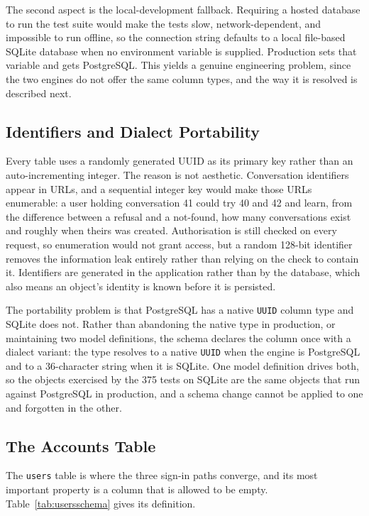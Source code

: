 The second aspect is the local-development fallback. Requiring a hosted database to run the
test suite would make the tests slow, network-dependent, and impossible to run offline, so
the connection string defaults to a local file-based SQLite database when no environment
variable is supplied. Production sets that variable and gets PostgreSQL. This yields a
genuine engineering problem, since the two engines do not offer the same column types, and
the way it is resolved is described next.

\subsection{Identifiers and Dialect Portability}

Every table uses a randomly generated UUID as its primary key rather than an
auto-incrementing integer. The reason is not aesthetic. Conversation identifiers appear in
URLs, and a sequential integer key would make those URLs enumerable: a user holding
conversation 41 could try 40 and 42 and learn, from the difference between a refusal and a
not-found, how many conversations exist and roughly when theirs was created. Authorisation
is still checked on every request, so enumeration would not grant access, but a random
128-bit identifier removes the information leak entirely rather than relying on the check to
contain it. Identifiers are generated in the application rather than by the database, which
also means an object's identity is known before it is persisted.

The portability problem is that PostgreSQL has a native \texttt{UUID} column type and SQLite
does not. Rather than abandoning the native type in production, or maintaining two model
definitions, the schema declares the column once with a dialect variant: the type resolves to
a native \texttt{UUID} when the engine is PostgreSQL and to a 36-character string when it is
SQLite. One model definition drives both, so the objects exercised by the 375 tests on SQLite
are the same objects that run against PostgreSQL in production, and a schema change cannot
be applied to one and forgotten in the other.

\subsection{The Accounts Table}

The \texttt{users} table is where the three sign-in paths converge, and its most important
property is a column that is allowed to be empty. Table~\ref{tab:usersschema} gives its
definition.

